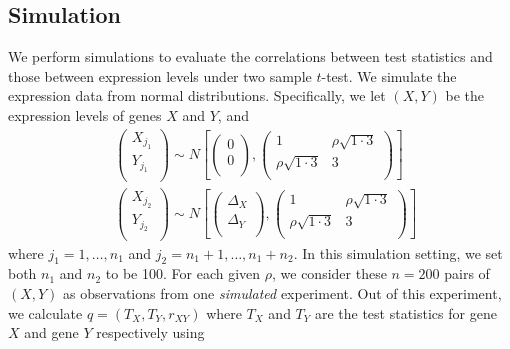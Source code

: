 \documentclass[12pt, a4paper]{article}
\begin{document}
	\subsection{Simulation}
	We perform simulations to evaluate the correlations between test statistics and those between expression levels under two sample $t$-test. We simulate the expression data from normal distributions. Specifically, we let $(X, Y)$ be the expression levels of genes $X$ and $Y$, and
	\begin{equation}
		\begin{aligned}
			&\left( \begin{array}{c}
				X_{j_1}\\
				Y_{j_1}\\
			\end{array}\right)
			\sim N\left[
			\left(\begin{array}{c}
				0\\
				0\\
			\end{array} \right), 
			\left(
			\begin{array}{cc}
				1 &\rho \sqrt{1\cdot 3} \\
				\rho \sqrt{1\cdot 3} & 	3 \\
			\end{array}
			\right)
			\right] \\
			& \left( \begin{array}{c}
				X_{j_2}\\
				Y_{j_2}\\
			\end{array}\right)
			\sim N\left[
			\left(\begin{array}{c}
				\Delta_X\\
				 \Delta_Y\\
			\end{array} \right), 
			\left(
			\begin{array}{cc}
				1 &\rho \sqrt{1\cdot 3} \\
				\rho \sqrt{1\cdot 3} & 	3 \\
			\end{array}
			\right)
			\right] 
		\end{aligned}
	\end{equation}
	where $j_1 = 1,\ldots, n_1$ and $j_2 = n_1 + 1, \ldots, n_1 + n_2$. In this simulation setting, we set both $n_1$ and $n_2$ to be 100.  For each given $\rho$, we consider these $n=200$ pairs of $(X, Y)$
	as observations from one \textit{simulated} experiment. Out of this experiment, we calculate $q = (T_X, T_Y, r_{XY})$ where $T_X$ and $T_Y$ are the test statistics for gene $X$ and gene $Y$ respectively using 
\end{document}
